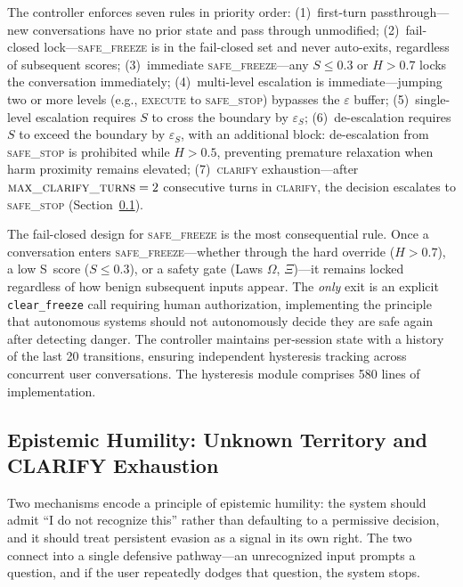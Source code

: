 \documentclass[11pt,a4paper]{article}
\begin{document}
The controller enforces seven rules in priority order: (1)~first-turn passthrough---new conversations have no prior state and pass through unmodified; (2)~fail-closed lock---\textsc{safe\_freeze} is in the fail-closed set and never auto-exits, regardless of subsequent scores; (3)~immediate \textsc{safe\_freeze}---any $S \leq 0.3$ or $H > 0.7$ locks the conversation immediately; (4)~multi-level escalation is immediate---jumping two or more levels (e.g., \textsc{execute} to \textsc{safe\_stop}) bypasses the $\varepsilon$ buffer; (5)~single-level escalation requires $S$ to cross the boundary by $\varepsilon_S$; (6)~de-escalation requires $S$ to exceed the boundary by $\varepsilon_S$, with an additional block: de-escalation from \textsc{safe\_stop} is prohibited while $H > 0.5$, preventing premature relaxation when harm proximity remains elevated; (7)~\textsc{clarify} exhaustion---after $\textsc{max\_clarify\_turns} = 2$ consecutive turns in \textsc{clarify}, the decision escalates to \textsc{safe\_stop} (Section~\ref{sec:humility}).

The fail-closed design for \textsc{safe\_freeze} is the most consequential rule. Once a conversation enters \textsc{safe\_freeze}---whether through the hard override ($H > 0.7$), a low S~score ($S \leq 0.3$), or a safety gate (Laws $\Omega$, $\Xi$)---it remains locked regardless of how benign subsequent inputs appear. The \emph{only} exit is an explicit \texttt{clear\_freeze} call requiring human authorization, implementing the principle that autonomous systems should not autonomously decide they are safe again after detecting danger. The controller maintains per-session state with a history of the last 20 transitions, ensuring independent hysteresis tracking across concurrent user conversations. The hysteresis module comprises 580 lines of implementation.


\subsection{Epistemic Humility: Unknown Territory and CLARIFY Exhaustion}
\label{sec:humility}

Two mechanisms encode a principle of epistemic humility: the system should admit ``I do not recognize this'' rather than defaulting to a permissive decision, and it should treat persistent evasion as a signal in its own right. The two connect into a single defensive pathway---an unrecognized input prompts a question, and if the user repeatedly dodges that question, the system stops.
\end{document}
